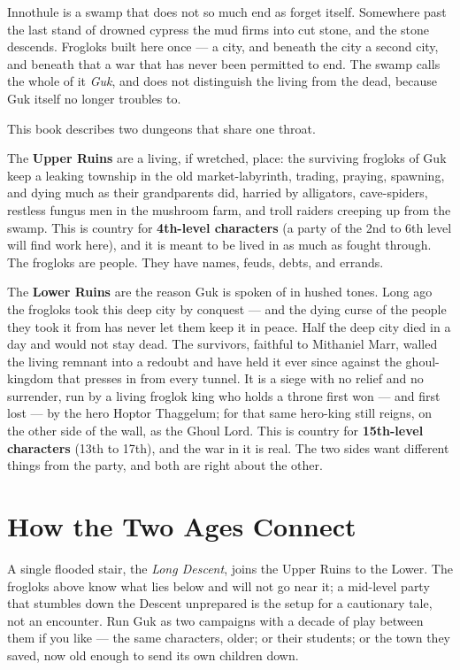 \documentclass[10pt,twoside]{report}
\begin{document}
\begin{readaloud}
Innothule is a swamp that does not so much end as forget itself. Somewhere past the last stand of drowned cypress the mud firms into cut stone, and the stone descends. Frogloks built here once --- a city, and beneath the city a second city, and beneath that a war that has never been permitted to end. The swamp calls the whole of it \emph{Guk}, and does not distinguish the living from the dead, because Guk itself no longer troubles to.
\end{readaloud}

\noindent This book describes two dungeons that share one throat.

The \textbf{Upper Ruins} are a living, if wretched, place: the surviving frogloks of Guk keep a leaking township in the old market-labyrinth, trading, praying, spawning, and dying much as their grandparents did, harried by alligators, cave-spiders, restless fungus men in the mushroom farm, and troll raiders creeping up from the swamp. This is country for \textbf{4th-level characters} (a party of the 2nd to 6th level will find work here), and it is meant to be lived in as much as fought through. The frogloks are people. They have names, feuds, debts, and errands.

The \textbf{Lower Ruins} are the reason Guk is spoken of in hushed tones. Long ago the frogloks took this deep city by conquest --- and the dying curse of the people they took it from has never let them keep it in peace. Half the deep city died in a day and would not stay dead. The survivors, faithful to Mithaniel Marr, walled the living remnant into a redoubt and have held it ever since against the ghoul-kingdom that presses in from every tunnel. It is a siege with no relief and no surrender, run by a living froglok king who holds a throne first won --- and first lost --- by the hero Hoptor Thaggelum; for that same hero-king still reigns, on the other side of the wall, as the Ghoul Lord. This is country for \textbf{15th-level characters} (13th to 17th), and the war in it is real. The two sides want different things from the party, and both are right about the other.

\section*{How the Two Ages Connect}
A single flooded stair, the \emph{Long Descent}, joins the Upper Ruins to the Lower. The frogloks above know what lies below and will not go near it; a mid-level party that stumbles down the Descent unprepared is the setup for a cautionary tale, not an encounter. Run Guk as two campaigns with a decade of play between them if you like --- the same characters, older; or their students; or the town they saved, now old enough to send its own children down.
\end{document}
